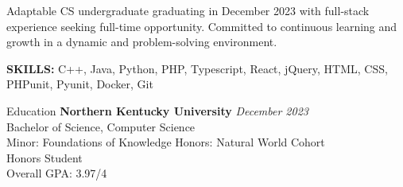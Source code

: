 \documentclass[11pt]{resume}
\begin{document}
{\centering 
Adaptable CS undergraduate graduating in December 2023 with full-stack experience seeking full-time opportunity. Committed to continuous learning and growth in a dynamic and problem-solving environment.
\par
}
\vspace{10pt}

{\textbf{SKILLS:}} C++, Java, Python, PHP, Typescript, React, jQuery, HTML, CSS, PHPunit, Pyunit, Docker, Git \\
\vspace*{-10pt}

\begin{rSection}{Education}
    \textbf{Northern Kentucky University} \hfill \textit{December 2023} \\ 
    Bachelor of Science, Computer Science \\
    Minor: Foundations of Knowledge Honors: Natural World Cohort \\
    Honors Student \\
    Overall GPA: 3.97/4

\end{rSection}
\end{document}
